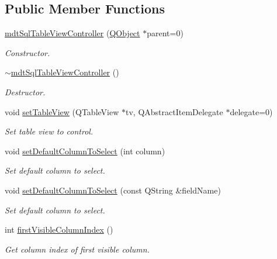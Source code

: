 \subsection*{Public Member Functions}
\begin{DoxyCompactItemize}
\item 
\hyperlink{classmdt_sql_table_view_controller_a45353c87eb09e39286b1223cbbe57264}{mdt\-Sql\-Table\-View\-Controller} (\hyperlink{class_q_object}{Q\-Object} $\ast$parent=0)
\begin{DoxyCompactList}\small\item\em Constructor. \end{DoxyCompactList}\item 
\hyperlink{classmdt_sql_table_view_controller_ab27ae6453b6f2f393093b2391e1c0fdc}{$\sim$mdt\-Sql\-Table\-View\-Controller} ()
\begin{DoxyCompactList}\small\item\em Destructor. \end{DoxyCompactList}\item 
void \hyperlink{classmdt_sql_table_view_controller_a418030d1344a6f6928e444bad4413b41}{set\-Table\-View} (Q\-Table\-View $\ast$tv, Q\-Abstract\-Item\-Delegate $\ast$delegate=0)
\begin{DoxyCompactList}\small\item\em Set table view to control. \end{DoxyCompactList}\item 
void \hyperlink{classmdt_sql_table_view_controller_ab3c8ab8d57f4d8429de3197416c499a0}{set\-Default\-Column\-To\-Select} (int column)
\begin{DoxyCompactList}\small\item\em Set default column to select. \end{DoxyCompactList}\item 
void \hyperlink{classmdt_sql_table_view_controller_a97ac3160e2962953f4cb69826b77f242}{set\-Default\-Column\-To\-Select} (const Q\-String \&field\-Name)
\begin{DoxyCompactList}\small\item\em Set default column to select. \end{DoxyCompactList}\item 
int \hyperlink{classmdt_sql_table_view_controller_a62da5915a170ad19bb123d600732ee26}{first\-Visible\-Column\-Index} ()
\begin{DoxyCompactList}\small\item\em Get column index of first visible column. \end{DoxyCompactList}\item 

\end{DoxyCompactItemize}
